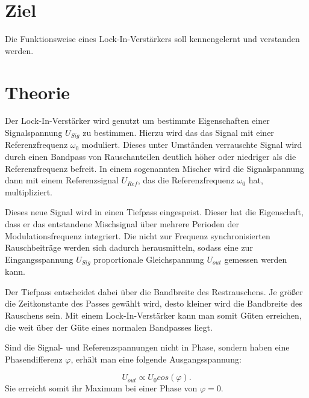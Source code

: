 \section{Ziel}
\label{sec:Ziel}

Die Funktionsweise eines Lock-In-Verstärkers soll kennengelernt und verstanden werden. 

\section{Theorie}
\label{sec:Theorie}

Der Lock-In-Verstärker wird genutzt um bestimmte Eigenschaften einer Signalspannung 
$U_{Sig}$ zu bestimmen.
Hierzu wird das das Signal mit einer Referenzfrequenz $\omega_0$ moduliert.
Dieses unter Umständen verrauschte Signal wird durch einen Bandpass von Rauschanteilen 
deutlich höher oder niedriger als die Referenzfrequenz befreit. %
In einem sogenannten Mischer wird die Signalspannung dann mit einem Referenzsignal 
$U_{Ref}$, das die Referenzfrequenz $\omega_0$ hat, multipliziert. 

\noindent Dieses neue Signal wird in einen Tiefpass eingespeist. Dieser hat die 
Eigenschaft, dass er das entstandene Mischsignal über mehrere Perioden der 
Modulationsfrequenz integriert.
Die nicht zur Frequenz synchronisierten Rauschbeiträge werden sich dadurch 
herausmitteln, sodass eine zur Eingangsspannung $U_{Sig}$ proportionale Gleichspannung 
$U_{out}$ gemessen werden kann. 

\noindent Der Tiefpass entscheidet dabei über die Bandbreite des Restrauschens. 
Je größer die Zeitkonstante des Passes gewählt wird, desto kleiner wird die Bandbreite 
des Rauschens sein. Mit einem Lock-In-Verstärker kann man somit Güten erreichen, 
die weit über der Güte eines normalen Bandpasses liegt. %

Sind die Signal- und Referenzspannungen nicht in Phase, sondern haben eine 
Phasendifferenz $\varphi$, erhält man eine folgende Ausgangsspannung: 

\begin{equation}
    U_{out} \propto U_0 cos(\varphi).
\end{equation}
Sie erreicht somit ihr Maximum bei einer Phase von $\varphi = 0$. 
